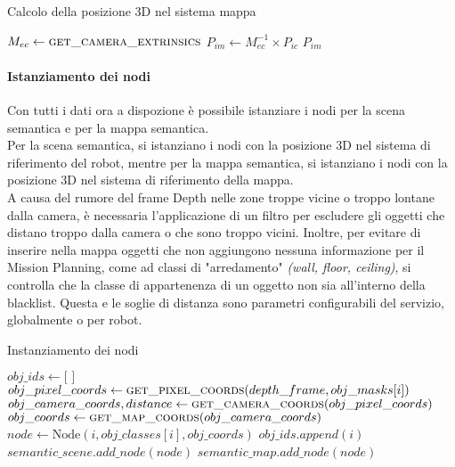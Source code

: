 \begin{algorithm}[H]
	\caption{Calcolo della posizione 3D nel sistema mappa}
	\begin{algorithmic}[1]
		\State $M_{ec} \gets \Call{get\_camera\_extrinsics}{}$ 
		\State $P_{im} \gets M_{ec}^{-1} \times P_{ic}$
		\State \Return $P_{im}$
		\EndProcedure
	\end{algorithmic}
\end{algorithm}

\paragraph{Istanziamento dei nodi}
Con tutti i dati ora a dispozione è possibile istanziare i nodi per la scena semantica e per la mappa semantica.\\
Per la scena semantica, si istanziano i nodi con la posizione 3D nel sistema di riferimento del robot, mentre per la mappa semantica, si istanziano i nodi con la posizione 3D nel sistema di riferimento della mappa. \\
A causa del rumore del frame Depth nelle zone troppe vicine o troppo lontane dalla camera, è necessaria l'applicazione di un filtro per escludere gli oggetti che distano troppo dalla camera o che sono troppo vicini. Inoltre, per evitare di inserire nella mappa oggetti che non aggiungono nessuna informazione per il Mission Planning, come ad classi di "arredamento" \textit{(wall, floor, ceiling)}, si controlla che la classe di appartenenza di un oggetto non sia all'interno della blacklist. Questa e le soglie di distanza sono parametri configurabili del servizio, globalmente o per robot.

\begin{algorithm}
	\caption{Instanziamento dei nodi}
	\begin{algorithmic}[1]
		\State $obj\_ids \gets \text{[ ]}$
		\State $obj\_pixel\_coords \gets \Call{get\_pixel\_coords}{depth\_frame, obj\_masks[i]}$
		\State $obj\_camera\_coords, distance \gets \Call{get\_camera\_coords}{obj\_pixel\_coords}$
		\State $obj\_coords \gets \Call{get\_map\_coords}{obj\_camera\_coords}$
		\State $node \gets \text{Node}(i, obj\_classes[i], obj\_coords)$
		\State $obj\_ids.append(i)$
		\State $semantic\_scene.add\_node(node)$
		\State $semantic\_map.add\_node(node)$
		\EndIf
		\EndFor
	\end{algorithmic}
\end{algorithm}


